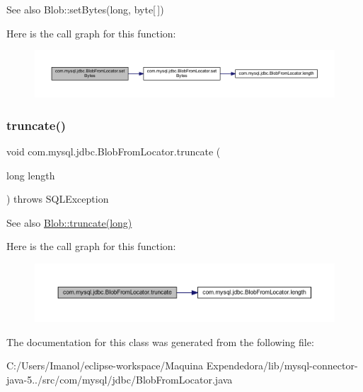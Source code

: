 \begin{DoxySeeAlso}{See also}
Blob\+::set\+Bytes(long, byte\mbox{[}$\,$\mbox{]}) 
\end{DoxySeeAlso}
Here is the call graph for this function\+:\nopagebreak
\begin{figure}[H]
\begin{center}
\leavevmode
\includegraphics[width=350pt]{classcom_1_1mysql_1_1jdbc_1_1_blob_from_locator_a564129d2e7b411e349ec285989c47465_cgraph}
\end{center}
\end{figure}
\mbox{\label{classcom_1_1mysql_1_1jdbc_1_1_blob_from_locator_a0197778a0d86c6856a53e6d177c569b9}} 
\subsubsection{\texorpdfstring{truncate()}{truncate()}}
{\footnotesize\ttfamily void com.\+mysql.\+jdbc.\+Blob\+From\+Locator.\+truncate (\begin{DoxyParamCaption}\item[{long}]{length }\end{DoxyParamCaption}) throws S\+Q\+L\+Exception}

\begin{DoxySeeAlso}{See also}
\mbox{\hyperlink{classcom_1_1mysql_1_1jdbc_1_1_blob_ac1341e0ed7c4ba983773aee70c265cb9}{Blob\+::truncate(long)}} 
\end{DoxySeeAlso}
Here is the call graph for this function\+:\nopagebreak
\begin{figure}[H]
\begin{center}
\leavevmode
\includegraphics[width=350pt]{classcom_1_1mysql_1_1jdbc_1_1_blob_from_locator_a0197778a0d86c6856a53e6d177c569b9_cgraph}
\end{center}
\end{figure}


The documentation for this class was generated from the following file\+:\begin{DoxyCompactItemize}
\item 
C\+:/\+Users/\+Imanol/eclipse-\/workspace/\+Maquina Expendedora/lib/mysql-\/connector-\/java-\/5../src/com/mysql/jdbc/Blob\+From\+Locator.\+java\end{DoxyCompactItemize}
